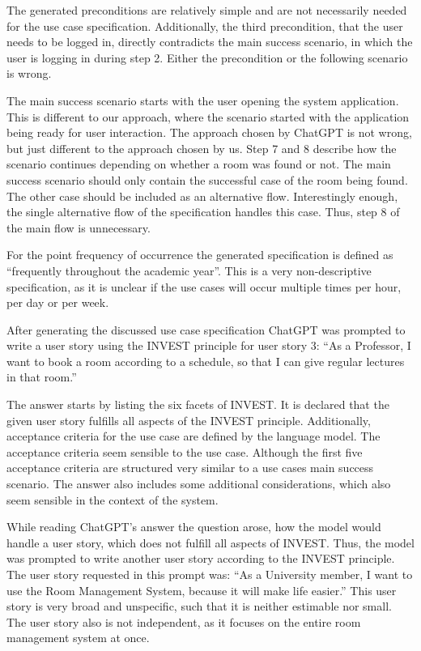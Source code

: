 \documentclass[conference,onecolumn]{IEEEtran}
\begin{document}
The generated preconditions are relatively simple and are not necessarily needed for the use case specification. Additionally, the third precondition, that the user needs to be logged in, directly contradicts the main success scenario, in which the user is logging in during step 2. Either the precondition or the following scenario is wrong.

The main success scenario starts with the user opening the system application. This is different to our approach, where the scenario started with the application being ready for user interaction. The approach chosen by ChatGPT is not wrong, but just different to the approach chosen by us.
Step 7 and 8 describe how the scenario continues depending on whether a room was found or not. The main success scenario should only contain the successful case of the room being found. The other case should be included as an alternative flow.
Interestingly enough, the single alternative flow of the specification handles this case. Thus, step 8 of the main flow is unnecessary.

For the point frequency of occurrence the generated specification is defined as ``frequently throughout the academic year''. This is a very non-descriptive specification, as it is unclear if the use cases will occur multiple times per hour, per day or per week.


After generating the discussed use case specification ChatGPT was prompted to write a user story using the INVEST principle for user story 3: ``As a Professor, I want to book a room according to a schedule, so that I can give regular lectures in that room.''

The answer starts by listing the six facets of INVEST. It is declared that the given user story fulfills all aspects of the INVEST principle.
Additionally, acceptance criteria for the use case are defined by the language model. The acceptance criteria seem sensible to the use case. Although the first five acceptance criteria are structured very similar to a use cases main success scenario.
The answer also includes some additional considerations, which also seem sensible in the context of the system.

While reading ChatGPT's answer the question arose, how the model would handle a user story, which does not fulfill all aspects of INVEST.
Thus, the model was prompted to write another user story according to the INVEST principle. The user story requested in this prompt was: ``As a University member, I want to use the Room Management System, because it will make life easier.''
This user story is very broad and unspecific, such that it is neither estimable nor small. The user story also is not independent, as it focuses on the entire room management system at once.
\end{document}
